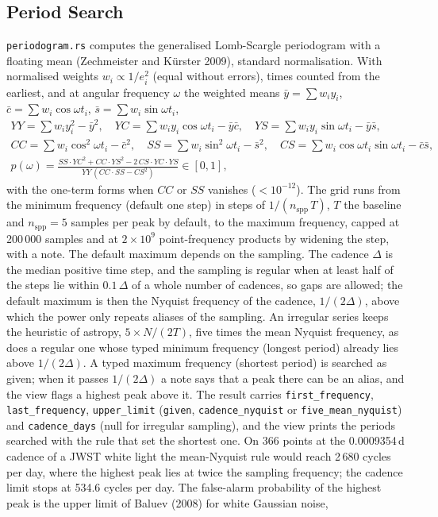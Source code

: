 \documentclass[11pt,a4paper]{article}
\newcommand{\code}[1]{\texttt{\small #1}}
\begin{document}
    \subsection{Period Search}
    \label{sec:gls}

    \code{periodogram.rs} computes the generalised Lomb-Scargle periodogram with a floating mean (Zechmeister and K\"urster 2009), standard normalisation. With normalised weights $w_i \propto 1/e_i^2$ (equal without errors), times counted from the earliest, and at angular frequency $\omega$ the weighted means $\bar{y} = \sum w_i y_i$, $\bar{c} = \sum w_i \cos\omega t_i$, $\bar{s} = \sum w_i \sin\omega t_i$,
    \begin{equation}
    \begin{gathered}
        YY = \textstyle\sum w_i y_i^2 - \bar{y}^2, \quad YC = \textstyle\sum w_i y_i \cos\omega t_i - \bar{y}\bar{c}, \quad YS = \textstyle\sum w_i y_i \sin\omega t_i - \bar{y}\bar{s}, \\
        CC = \textstyle\sum w_i \cos^2\omega t_i - \bar{c}^2, \quad SS = \textstyle\sum w_i \sin^2\omega t_i - \bar{s}^2, \quad CS = \textstyle\sum w_i \cos\omega t_i \sin\omega t_i - \bar{c}\bar{s}, \\
        p(\omega) = \frac{SS\cdot YC^2 + CC\cdot YS^2 - 2\,CS\cdot YC\cdot YS}{YY\,(CC\cdot SS - CS^2)} \in [0, 1],
    \end{gathered}
    \end{equation}
    with the one-term forms when $CC$ or $SS$ vanishes ($< 10^{-12}$). The grid runs from the minimum frequency (default one step) in steps of $1/(n_{\text{spp}}\,T)$, $T$ the baseline and $n_{\text{spp}} = 5$ samples per peak by default, to the maximum frequency, capped at 200\,000 samples and at $2 \times 10^9$ point-frequency products by widening the step, with a note. The default maximum depends on the sampling. The cadence $\Delta$ is the median positive time step, and the sampling is regular when at least half of the steps lie within $0.1\,\Delta$ of a whole number of cadences, so gaps are allowed; the default maximum is then the Nyquist frequency of the cadence, $1/(2\Delta)$, above which the power only repeats aliases of the sampling. An irregular series keeps the heuristic of astropy, $5 \times N/(2T)$, five times the mean Nyquist frequency, as does a regular one whose typed minimum frequency (longest period) already lies above $1/(2\Delta)$. A typed maximum frequency (shortest period) is searched as given; when it passes $1/(2\Delta)$ a note says that a peak there can be an alias, and the view flags a highest peak above it. The result carries \code{first\_frequency}, \code{last\_frequency}, \code{upper\_limit} (\code{given}, \code{cadence\_nyquist} or \code{five\_mean\_nyquist}) and \code{cadence\_days} (null for irregular sampling), and the view prints the periods searched with the rule that set the shortest one. On 366 points at the 0.0009354\,d cadence of a JWST white light the mean-Nyquist rule would reach 2\,680 cycles per day, where the highest peak lies at twice the sampling frequency; the cadence limit stops at 534.6 cycles per day. The false-alarm probability of the highest peak is the upper limit of Baluev (2008) for white Gaussian noise,
\end{document}
